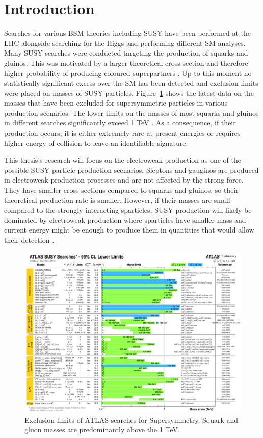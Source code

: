 \section{Introduction}

Searches for various BSM theories including SUSY have been performed at the LHC  alongside searching for the Higgs and performing different SM analyses. Many SUSY searches were conducted targeting the production of squarks and gluinos. This was motivated by a larger theoretical cross-section and therefore higher probability of producing coloured superpartners \cite{borschensky2014squark}. Up to this moment no statistically significant excess over the SM has been detected and exclusion limits were placed on masses of SUSY particles. Figure~\ref{fig:SUSYlimit} shows the latest data on the masses that have been excluded for supersymmetric particles in various production scenarios. The lower limits on the masses of most squarks and gluinos in different searches significantly exceed 1 TeV \citep{aad2015summary}. As a consequence, if their production occurs, it is either extremely rare at present energies or requires higher energy of collision to leave an identifiable signature. 

This thesis's research will focus on the electroweak production as one of the possible SUSY particle production scenarios. Sleptons and gauginos are produced in electroweak production processes and are not affected by the strong force. They have smaller cross-sections compared to squarks and gluinos, so their theoretical production rate is smaller. However, if their masses are small compared to the strongly interacting sparticles, SUSY production will likely be dominated by electroweak production where sparticles have smaller mass and current energy might be enough to produce them in quantities that would allow their detection \citep{atlas2015search}. 
\begin{figure}
\includegraphics[width=\textwidth]{Chap3/ATLAS_SUSY_Summary.png}
\caption[Exclusion limits of ATLAS searches for Supersymmetry]{Exclusion limits of ATLAS searches for Supersymmetry. Squark and gluon masses are predominantly above the 1 TeV. \citep{SUSYlimits}}
\label{fig:SUSYlimit}
\end{figure}
\cleardoublepage


